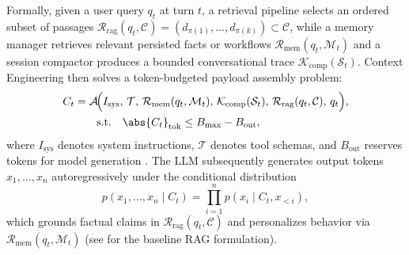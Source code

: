 \documentclass[../../../../master.tex]{subfiles}
\begin{document}
Formally, given a user query $q_t$ at turn $t$, a retrieval pipeline selects an ordered subset of passages $\mathcal{R}_{\mathrm{rag}}(q_t, \mathcal{C}) = (d_{\pi(1)}, \dots, d_{\pi(k)}) \subset \mathcal{C}$, while a memory manager retrieves relevant persisted facts or workflows $\mathcal{R}_{\mathrm{mem}}(q_t, \mathcal{M}_t)$ and a session compactor produces a bounded conversational trace $\mathcal{K}_{\mathrm{comp}}(\mathcal{S}_t)$. Context Engineering then solves a token-budgeted payload assembly problem:
\begin{equation}
\begin{aligned}
  C_t &= \mathcal{A}\!\Big(I_{\mathrm{sys}},\, \mathcal{T},\, \mathcal{R}_{\mathrm{mem}}(q_t, \mathcal{M}_t),\, \mathcal{K}_{\mathrm{comp}}(\mathcal{S}_t),\, \mathcal{R}_{\mathrm{rag}}(q_t, \mathcal{C}),\, q_t\Big), \\
  &\qquad \text{s.t.} \quad \abs{C_t}_{\mathrm{tok}} \le B_{\max} - B_{\mathrm{out}},
\end{aligned}
  \label{eq:rag:context_assembly}
\end{equation}
where $I_{\mathrm{sys}}$ denotes system instructions, $\mathcal{T}$ denotes tool schemas, and $B_{\mathrm{out}}$ reserves tokens for model generation . The LLM subsequently generates output tokens $x_1, \dots, x_n$ autoregressively under the conditional distribution
\begin{equation}
  p(x_1, \dots, x_n \mid C_t) = \prod_{i=1}^{n} p(x_i \mid C_t, x_{<i}),
  \label{eq:rag:gen_prob}
\end{equation}
which grounds factual claims in $\mathcal{R}_{\mathrm{rag}}(q_t, \mathcal{C})$ and personalizes behavior via $\mathcal{R}_{\mathrm{mem}}(q_t, \mathcal{M}_t)$ (see  for the baseline RAG formulation).

\end{document}

